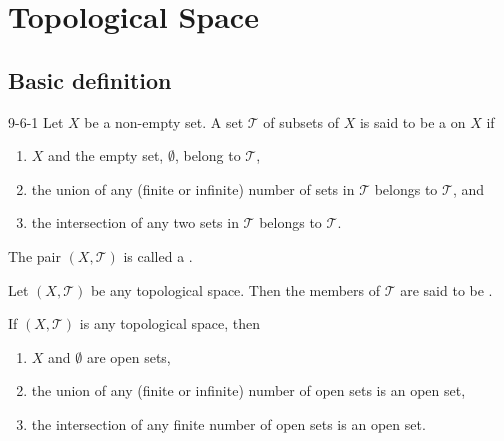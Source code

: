 \documentclass[../main.tex]{subfiles}
\begin{document}
\ifSubfilesClassLoaded{

    \tableofcontents
    
}{}

\chapter{ Topological Space }
\section{Basic definition}
\begin{definition}{}{9-6-1}
Let $X$ be a non-empty set. A set $\mathcal{T}$ of subsets of $X$ is said to be a  on $X$ if
\begin{enumerate}
    \item[(i)] $X$ and the empty set, $\emptyset$, belong to $\mathcal{T}$,
    \item[(ii)] the union of any (finite or infinite) number of sets in $\mathcal{T}$ belongs to $\mathcal{T}$, and
    \item[(iii)] the intersection of any two sets in $\mathcal{T}$ belongs to $\mathcal{T}$.
\end{enumerate}
The pair $(X, \mathcal{T})$ is called a .
\end{definition}
\begin{definition}{}{}
Let $(X, \mathcal{T})$ be any topological space. Then the members of $\mathcal{T}$ are said to be .
\end{definition}
\begin{proposition}{}{}
If $(X, \mathcal{T})$ is any topological space, then
\begin{enumerate}
    \item[(i)] $X$ and $\emptyset$ are open sets,
    \item[(ii)] the union of any (finite or infinite) number of open sets is an open set,
    \item[(iii)] the intersection of any finite number of open sets is an open set.
\end{enumerate}
\end{proposition}
\end{document}
